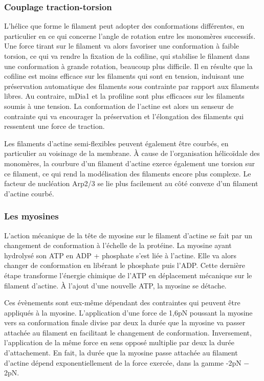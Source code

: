 \subsubsection{Couplage traction-torsion}

L'hélice que forme le filament peut adopter des conformations différentes, en particulier en ce qui concerne l'angle de rotation entre les monomères successifs. 
Une force tirant sur le filament va alors favoriser une conformation à faible torsion, ce qui va rendre la fixation de la cofiline, qui stabilise le filament dans une conformation à grande rotation, beaucoup plus difficile. 
Il en résulte que la cofiline est moins efficace sur les filaments qui sont en tension, induisant une préservation automatique des filaments sous contrainte par rapport aux filaments libres. 
Au contraire, mDia1 et la profiline sont plus efficaces sur les filaments soumis à une tension. 
La conformation de l'actine est alors un senseur de contrainte qui va encourager la préservation et l'élongation des filaments qui ressentent une force de traction. 

Les filaments d'actine semi-flexibles peuvent également être courbés, en particulier au voisinage de la membrane. 
À cause de l'organisation hélicoïdale des monomères, la courbure d'un filament d'actine exerce également une torsion sur ce filament, ce qui rend la modélisation des filaments encore plus complexe. 
Le facteur de nucléation Arp2/3 se lie plus facilement au côté convexe d'un filament d'actine courbé. 

\subsubsection{Les myosines}

L'action mécanique de la tête de myosine sur le filament d'actine se fait par un changement de conformation à l'échelle de la protéine. 
La myosine ayant hydrolysé son ATP en ADP + phosphate s'est liée à l'actine. Elle va alors changer de conformation en libérant le phosphate puis l'ADP. 
Cette dernière étape transforme l'énergie chimique de l'ATP en déplacement mécanique sur le filament d'actine. 
À l'ajout d'une nouvelle ATP, la myosine se détache. 

Ces évènements sont eux-même dépendant des contraintes qui peuvent être appliqués à la myosine. 
L'application d'une force de 1,6pN poussant la myosine vers sa conformation finale divise par deux la durée que la myosine va passer attachée au filament en facilitant le changement de conformation. 
Inversement, l'application de la même force en sens opposé multiplie par deux la durée d'attachement. 
En fait, la durée que la myosine passe attachée au filament d'actine dépend exponentiellement de la force exercée, dans la gamme -2pN $-$ 2pN. 


